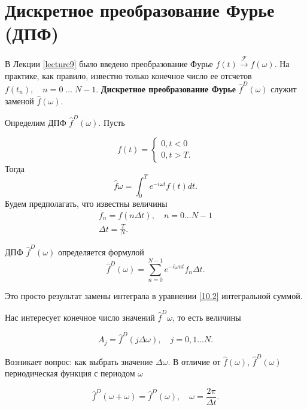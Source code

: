 \section{Дискретное преобразование Фурье (ДПФ)}
\label{lecture10}

В Лекции \ref{lecture9} было введено преобразование Фурье $f(t) \xrightarrow{\mathscr{F}} \hat{f}(\omega)$. На практике, как правило, известно только конечное число ее отсчетов $f(t_n),\quad n = 0 \; ...\;N-1$. \textbf{Дискретное преобразование Фурье} $\hat{f}^D(\omega)$ служит заменой $\hat{f}(\omega)$.

Определим ДПФ $\hat{f}^D(\omega)$. Пусть

\begin{equation}\label{10.1}
f(t) = 
\begin{cases}
0, t < 0 \\
0, t > T.
\end{cases}
\end{equation}
Тогда
\begin{equation}\label{10.2}
\hat{f}\omega = \int_{0}^{T}e^{-i\omega t}f(t)dt.
\end{equation}
Будем предполагать, что известны величины
\begin{equation}\label{10.3}
\begin{gathered}
f_n = f(n \Delta t), \quad n = 0 ... N-1 \\
\Delta t = \frac{T}{N}.
\end{gathered}
\end{equation}

ДПФ $\hat{f}^D(\omega)$ определяется формулой
\begin{equation}\label{10.4}
\hat{f}^D(\omega) = \sum_{n = 0}^{N - 1} e^{-i \omega nt}f_n\Delta t.
\end{equation}

Это просто результат замены интеграла в уравнении \ref{10.2} интегральной суммой.

Нас интересует конечное число значений $\hat{f}^D\omega$, то есть величины 

\begin{equation}\label{10.5}
A_j = \hat{f}^D(j \Delta \omega), \quad j = 0, 1 ... N.
\end{equation}

Возникает вопрос: как выбрать значение $\Delta \omega$.
В отличие от $ \hat{f}(\omega)$, $\hat{f}^D(\omega)$ периодическая функция с периодом $\omega$

\begin{equation}\label{10.6}
\hat{f}^D(\omega + \omega) = \hat{f}^D(\omega), \quad \omega = \frac{2\pi}{\Delta t}.
\end{equation}

